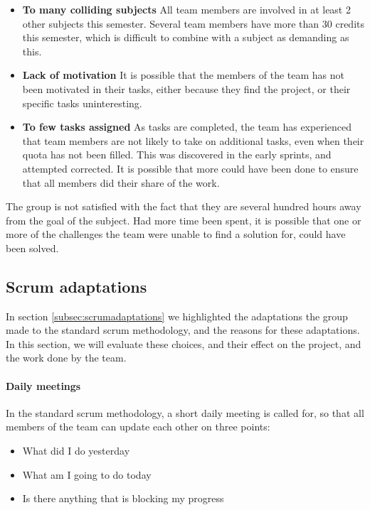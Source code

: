 \documentclass[11pt,a4paper,titlepage,oneside]{report}
\begin{document}
\begin{itemize}
\item \textbf{To many colliding subjects} All team members are involved in at least 2 other subjects this semester. Several team members have more than 30 credits this semester, which is difficult to combine with a subject as demanding as this.
\item \textbf{Lack of motivation} It is possible that the members of the team has not been motivated in their tasks, either because they find the project, or their specific tasks uninteresting. 
\item \textbf{To few tasks assigned} As tasks are completed, the team has experienced that team members are not likely to take on additional tasks, even when their quota has not been filled. This was discovered in the early sprints, and attempted corrected. It is possible that more could have been done to ensure that all members did their share of the work.
\end{itemize}

The group is not satisfied with the fact that they are several hundred hours away from the goal of the subject. Had more time been spent, it is possible that one or more of the challenges the team were unable to find a solution for, could have been solved. 


\subsection{Scrum adaptations}

\label{subsec:ScrumAdaptationsEval}
In section \ref{subsec:scrumadaptations} we highlighted the adaptations the group made to the standard scrum methodology, and the reasons for these adaptations. In this section, we will evaluate these choices, and their effect on the project, and the work done by the team. 
\paragraph{Daily meetings}
In the standard scrum methodology, a short daily meeting is called for, so that all members of the team can update each other on three points:

\begin{itemize}
\item What did I do yesterday
\item What am I going to do today
\item Is there anything that is blocking my progress
\end{itemize}
\end{document}
